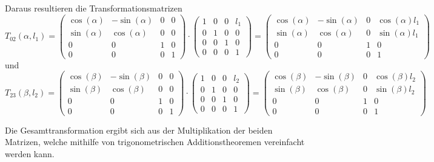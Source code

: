 \documentclass{MSM_latex}
\begin{document}
Daraus resultieren die Transformationsmatrizen
\begin{equation*}
	T_{02}(\alpha, l_1) = \begin{pmatrix}
	\cos(\alpha) & -\sin(\alpha) & 0 & 0 \\
	\sin(\alpha) & \cos(\alpha) & 0 & 0 \\
	0 & 0 & 1 & 0 \\
	0 & 0 & 0 & 1
	\end{pmatrix} \cdot \begin{pmatrix}
	1 & 0 & 0 & l_1 \\
	0 & 1 & 0 & 0 \\
	0 & 0 & 1 & 0 \\
	0 & 0 & 0 & 1
	\end{pmatrix} = \begin{pmatrix}
	\cos(\alpha) & -\sin(\alpha) & 0 & \cos(\alpha) l_1 \\
	\sin(\alpha) & \cos(\alpha) & 0 & \sin(\alpha) l_1 \\
	0 & 0 & 1 & 0 \\
	0 & 0 & 0 & 1
	\end{pmatrix}
\end{equation*}
und
\begin{equation*}
	T_{23}(\beta, l_2) = \begin{pmatrix}
	\cos(\beta) & -\sin(\beta) & 0 & 0 \\
	\sin(\beta) & \cos(\beta) & 0 & 0 \\
	0 & 0 & 1 & 0 \\
	0 & 0 & 0 & 1
	\end{pmatrix} \cdot \begin{pmatrix}
	1 & 0 & 0 & l_2 \\
	0 & 1 & 0 & 0 \\
	0 & 0 & 1 & 0 \\
	0 & 0 & 0 & 1
	\end{pmatrix} = \begin{pmatrix}
	\cos(\beta) & -\sin(\beta) & 0 & \cos(\beta) l_2 \\
	\sin(\beta) & \cos(\beta) & 0 & \sin(\beta) l_2 \\
	0 & 0 & 1 & 0 \\
	0 & 0 & 0 & 1
	\end{pmatrix}
\end{equation*}

Die Gesamttransformation ergibt sich aus der Multiplikation der beiden Matrizen, welche mithilfe von trigonometrischen Additionstheoremen vereinfacht werden kann.
\end{document}
